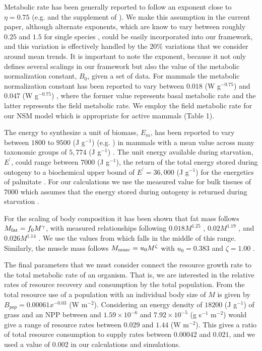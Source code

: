 \documentclass{pnastwo}
\begin{document}
\begin{article}
Metabolic rate has been generally reported to follow an exponent close to $\eta=0.75$ (e.g. \cite{West:2001bv,moses2008rmo} and the supplement of \cite{hou}). We make this assumption in the current paper, although alternate exponents, which are know to vary between roughly $0.25$ and $1.5$ for single species \cite{moses2008rmo}, could be easily incorporated into our framework, and this variation is effectively handled by the $20\%$ variations that we consider around mean trends. It is important to note the exponent, because it not only defines several scalings in our framework but also the value of the metabolic normalization constant, $B_{0}$, given a set of data.  For mammals the metabolic normalization constant has been reported to vary between $0.018$ (W g$^{-0.75}$) and $0.047$ (W g$^{-0.75}$) \cite{hou,West:2001bv}, where the former value represents basal metabolic rate and the latter represents the field metabolic rate. We employ the field metabolic rate for our NSM model which is appropriate for active mammals (Table 1).

The energy to synthesize a unit of biomass, $E_{m}$, has been reported to vary between $1800$ to $9500$ (J g$^{-1}$) (e.g. \cite{West:2001bv,moses2008rmo,hou}) in mammals with a mean value across many taxonomic groups of $5,774$ (J g$^{-1}$) \cite{moses2008rmo}. The unit energy available during starvation, $E^{\prime}$, could range between $7000$ (J g$^{-1}$), the return of the total energy stored during ontogeny \cite{hou} to a biochemical upper bound of $E^{\prime}=36,000$ (J g$^{-1}$) for the energetics of palmitate \cite{stryer,hou}. For our calculations we use the measured value for bulk tissues of $7000$ which assumes that the energy stored during ontogeny is returned during starvation \cite{hou}. 

For the scaling of body composition it has been shown that fat mass follows $M_{\rm fat}=f_{0}M^{\gamma}$, with measured  relationships following  $0.018M^{1.25}$ \cite{Dunbrack:1993ec}, $0.02M^{1.19}$ \cite{Lindstedt:1985hm}, and $0.026M^{1.14}$ \cite{Lindstedt:2002td}. We use the values from \cite{Lindstedt:1985hm} which falls in the middle of this range. Similarly, the muscle mass follows $M_{\rm musc}=u_{0}M^{\zeta}$ with $u_{0}=0.383$ and $\zeta=1.00$ \cite{Lindstedt:2002td}.

The final parameters that we must consider connect the resource growth rate to the total metabolic rate of an organism. That is, we are interested in the relative rates of resource recovery and consumption by the total population. From \cite{allen2002global} the total resource use of a population with an individual body size of $M$ is given by $B_{pop}=0.00061x^{-0.03}$ (W m$^{-2}$). Considering an energy density of $18200$ (J g$^{-1}$) of grass \cite{estermann} and an NPP between and $1.59\times10^{-6}$ and $7.92\times10^{-5}$ (g s$^{-1}$ m$^{-2}$) would give a range of resource rates between  $0.029$ and $1.44$ (W m$^{-2}$). This gives a ratio of total resource consumption to supply rates between $0.00042$ and $0.021$, and we used a value of $0.002$ in our calculations and simulations.


\end{article}
\end{document}
